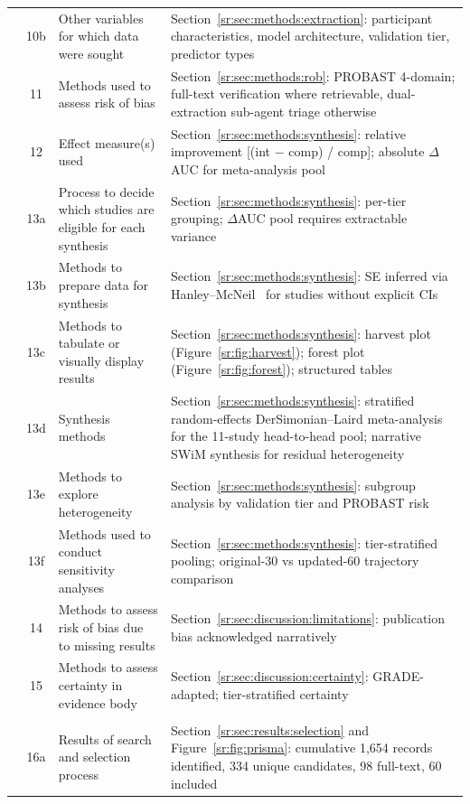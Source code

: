 \begin{longtable}{@{}p{1.6cm}cp{4.6cm}p{7.4cm}@{}}
         & 10b & Other variables for which data were sought & Section~\ref{sr:sec:methods:extraction}: participant characteristics, model architecture, validation tier, predictor types \\
         & 11 & Methods used to assess risk of bias & Section~\ref{sr:sec:methods:rob}: PROBAST 4-domain; full-text verification where retrievable, dual-extraction sub-agent triage otherwise \\
         & 12 & Effect measure(s) used & Section~\ref{sr:sec:methods:synthesis}: relative improvement [(int $-$ comp) / comp]; absolute $\Delta$AUC for meta-analysis pool \\
         & 13a & Process to decide which studies are eligible for each synthesis & Section~\ref{sr:sec:methods:synthesis}: per-tier grouping; $\Delta$AUC pool requires extractable variance \\
         & 13b & Methods to prepare data for synthesis & Section~\ref{sr:sec:methods:synthesis}: SE inferred via Hanley--McNeil~\cite{hanley1982} for studies without explicit CIs \\
         & 13c & Methods to tabulate or visually display results & Section~\ref{sr:sec:methods:synthesis}: harvest plot (Figure~\ref{sr:fig:harvest}); forest plot (Figure~\ref{sr:fig:forest}); structured tables \\
         & 13d & Synthesis methods & Section~\ref{sr:sec:methods:synthesis}: stratified random-effects DerSimonian--Laird meta-analysis for the 11-study head-to-head pool; narrative SWiM synthesis for residual heterogeneity \\
         & 13e & Methods to explore heterogeneity & Section~\ref{sr:sec:methods:synthesis}: subgroup analysis by validation tier and PROBAST risk \\
         & 13f & Methods used to conduct sensitivity analyses & Section~\ref{sr:sec:methods:synthesis}: tier-stratified pooling; original-30 vs updated-60 trajectory comparison \\
         & 14 & Methods to assess risk of bias due to missing results & Section~\ref{sr:sec:discussion:limitations}: publication bias acknowledged narratively \\
         & 15 & Methods to assess certainty in evidence body & Section~\ref{sr:sec:discussion:certainty}: GRADE-adapted; tier-stratified certainty \\
\addlinespace
\multicolumn{4}{@{}l}{\textbf{RESULTS}} \\
         & 16a & Results of search and selection process & Section~\ref{sr:sec:results:selection} and Figure~\ref{sr:fig:prisma}: cumulative 1{,}654 records identified, 334 unique candidates, 98 full-text, 60 included \\

\end{longtable}
